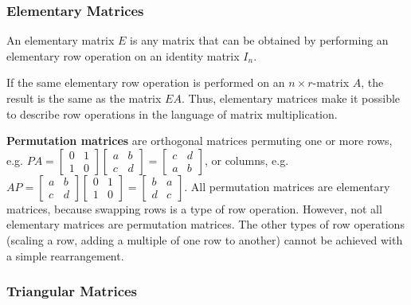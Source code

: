 \begin{paracol}{2}

\subsubsection{Elementary Matrices}

An elementary matrix $E$ is any matrix that can be obtained by performing an elementary row operation on an identity matrix $I_n$.

If the same elementary row operation is performed on an $n \times r$-matrix $A$, the result is the same as the matrix $EA$.
Thus, elementary matrices make it possible to describe row operations in the language of matrix multiplication.

\switchcolumn

\textbf{Permutation matrices} are orthogonal matrices permuting one or more rows, e.g. $PA = \begin{bmatrix}
    0 & 1 \\
    1 & 0
\end{bmatrix} \begin{bmatrix}
    a & b \\
    c & d
\end{bmatrix} = \begin{bmatrix}
    c & d \\
    a & b
\end{bmatrix}$, or columns, e.g. $AP = \begin{bmatrix}
    a & b \\
    c & d
\end{bmatrix} \begin{bmatrix}
    0 & 1 \\
    1 & 0
\end{bmatrix} = \begin{bmatrix}
    b & a \\
    d & c
\end{bmatrix}$.
All permutation matrices are elementary matrices, because swapping rows is a type of row operation. However, not all elementary matrices are permutation matrices. The other types of row operations (scaling a row, adding a multiple of one row to another) cannot be achieved with a simple rearrangement.

\end{paracol}

\subsubsection{Triangular Matrices}

